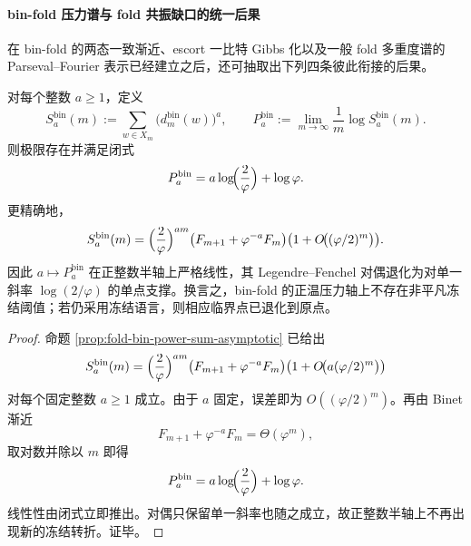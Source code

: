 \paragraph{bin-fold 压力谱与 fold 共振缺口的统一后果}
在 bin-fold 的两态一致渐近、escort 一比特 Gibbs 化以及一般 fold 多重度谱的 Parseval--Fourier 表示已经建立之后，还可抽取出下列四条彼此衔接的后果。

\begin{conclusion}\label{con:xi-time-part9m-binfold-linear-pressure-no-positive-threshold}
对每个整数 \(a\ge 1\)，定义
\[
S_a^{\mathrm{bin}}(m):=\sum_{w\in X_m}\bigl(d_m^{\mathrm{bin}}(w)\bigr)^a,
\qquad
P_a^{\mathrm{bin}}:=\lim_{m\to\infty}\frac{1}{m}\log S_a^{\mathrm{bin}}(m).
\]
则极限存在并满足闭式
\[
P_a^{\mathrm{bin}}
=
a\log\!\Bigl(\frac{2}{\varphi}\Bigr)+\log\varphi.
\]
更精确地，
\[
S_a^{\mathrm{bin}}(m)
=
\Bigl(\frac{2}{\varphi}\Bigr)^{am}
\bigl(F_{m+1}+\varphi^{-a}F_m\bigr)
\bigl(1+O\!\bigl((\varphi/2)^m\bigr)\bigr).
\]
因此 \(a\mapsto P_a^{\mathrm{bin}}\) 在正整数半轴上严格线性，其 Legendre--Fenchel 对偶退化为对单一斜率 \(\log(2/\varphi)\) 的单点支撑。换言之，bin-fold 的正温压力轴上不存在非平凡冻结阈值；若仍采用冻结语言，则相应临界点已退化到原点。
\end{conclusion}
\begin{proof}
命题 \ref{prop:fold-bin-power-sum-asymptotic} 已给出
\[
S_a^{\mathrm{bin}}(m)
=
\Bigl(\frac{2}{\varphi}\Bigr)^{am}
\bigl(F_{m+1}+\varphi^{-a}F_m\bigr)
\bigl(1+O\!\bigl(a(\varphi/2)^m\bigr)\bigr)
\]
对每个固定整数 \(a\ge 1\) 成立。由于 \(a\) 固定，误差即为 \(O((\varphi/2)^m)\)。再由 Binet 渐近
\[
F_{m+1}+\varphi^{-a}F_m=\Theta(\varphi^m),
\]
取对数并除以 \(m\) 即得
\[
P_a^{\mathrm{bin}}
=
a\log\!\Bigl(\frac{2}{\varphi}\Bigr)+\log\varphi.
\]
线性性由闭式立即推出。对偶只保留单一斜率也随之成立，故正整数半轴上不再出现新的冻结转折。证毕。
\end{proof}

